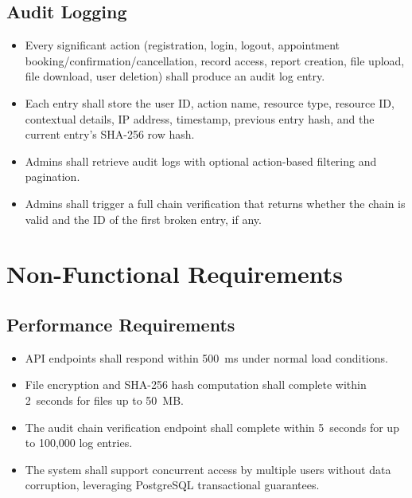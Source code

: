 \documentclass[a4paper,12pt]{report}
\begin{document}
\subsection{Audit Logging}
\begin{itemize}
    \item Every significant action (registration, login, logout, appointment booking/confirmation/cancellation, record access, report creation, file upload, file download, user deletion) shall produce an audit log entry.
    \item Each entry shall store the user ID, action name, resource type, resource ID, contextual details, IP address, timestamp, previous entry hash, and the current entry's SHA-256 row hash.
    \item Admins shall retrieve audit logs with optional action-based filtering and pagination.
    \item Admins shall trigger a full chain verification that returns whether the chain is valid and the ID of the first broken entry, if any.
\end{itemize}

\section{Non-Functional Requirements}

\subsection{Performance Requirements}
\begin{itemize}
    \item API endpoints shall respond within 500~ms under normal load conditions.
    \item File encryption and SHA-256 hash computation shall complete within 2~seconds for files up to 50~MB.
    \item The audit chain verification endpoint shall complete within 5~seconds for up to 100,000 log entries.
    \item The system shall support concurrent access by multiple users without data corruption, leveraging PostgreSQL transactional guarantees.
\end{itemize}
\end{document}
